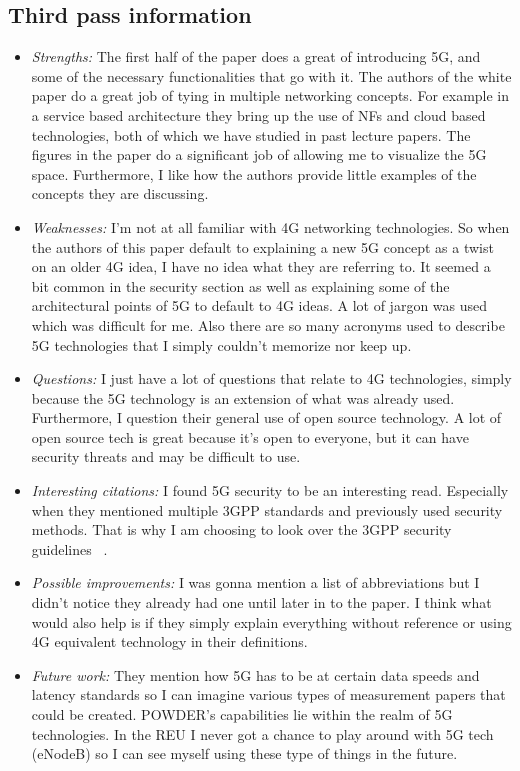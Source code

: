 \documentclass[letterpaper,twocolumn,10pt]{article}
\begin{document}
\subsection{Third pass information}
\label{sec:third}
\begin{itemize}

\item {\it Strengths:} 
The first half of the paper does a great of introducing 5G, and some of the necessary functionalities that 
go with it. The authors of the white paper do a great job of tying in multiple networking concepts. For 
example in a service based architecture they bring up the use of NFs and cloud based technologies, 
both of which we have studied in past lecture papers. The figures in the paper do a significant job 
of allowing me to visualize the 5G space. Furthermore, I like how the authors provide little examples
of the concepts they are discussing. 

\item {\it Weaknesses:} 
I'm not at all familiar with 4G networking technologies. So when the authors of this paper default 
to explaining a new 5G concept as a twist on an older 4G idea, I have no idea what they are referring 
to. It seemed a bit common in the security section as well as explaining some of the architectural points of 
5G to default to 4G ideas. A lot of jargon was used which was difficult for me. Also there are so many acronyms used to describe
5G technologies that I simply couldn't memorize nor keep up. 

\item {\it Questions:} 
I just have a lot of questions that relate to 4G technologies, simply because the 5G technology is an extension 
of what was already used. Furthermore, I question their general use of open source technology. A lot of open source
tech is great because it's open to everyone, but it can have security threats and may be difficult to use. 

\item {\it Interesting citations:} 
I found 5G security to be an interesting read. Especially when they mentioned multiple 3GPP standards 
and previously used security methods. That is why I am choosing to look over the 3GPP security guidelines 
~\cite{3gppsecurity}.

\item {\it Possible improvements:}
I was gonna mention a list of abbreviations but I didn't notice they already had one until later in to the paper. I think what 
would also help is if they simply explain everything without reference or using 4G equivalent technology in their
definitions.

\item {\it Future work:} 
They mention how 5G has to be at certain data speeds and latency standards so I can imagine various types
of measurement papers that could be created. POWDER's capabilities lie within the realm of 5G technologies. 
In the REU I never got a chance to play around with 5G tech (eNodeB) so I can see myself using these type of
things in the future.

\end{itemize}

{
  \small 
  
  
}
\end{document}
